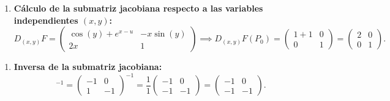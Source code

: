 \documentclass[11pt,a4paper]{article}
\begin{document}
\begin{enumerate}[label=\textbf{\arabic*.}]
\item \textbf{Cálculo de la submatriz jacobiana respecto a las variables independientes $(x,y)$:}
\begin{equation*}
D_{(x,y)}F = \begin{pmatrix} \cos(y) + e^{x-u} & -x\sin(y) \\ 2x & 1 \end{pmatrix} \implies D_{(x,y)}F(P_0) = \begin{pmatrix} 1 + 1 & 0 \\ 0 & 1 \end{pmatrix} = \begin{pmatrix} 2 & 0 \\ 0 & 1 \end{pmatrix}.
\end{equation*}
\end{enumerate}

\begin{enumerate}[label=\textbf{\arabic*.}]
\item \textbf{Inversa de la submatriz jacobiana:}
\begin{equation*}
[D_{(u,v)}F(P_0)]^{-1} = \begin{pmatrix} -1 & 0 \\ 1 & -1 \end{pmatrix}^{-1} = \frac{1}{1}\begin{pmatrix} -1 & 0 \\ -1 & -1 \end{pmatrix} = \begin{pmatrix} -1 & 0 \\ -1 & -1 \end{pmatrix}.
\end{equation*}
\end{enumerate}
\end{document}
